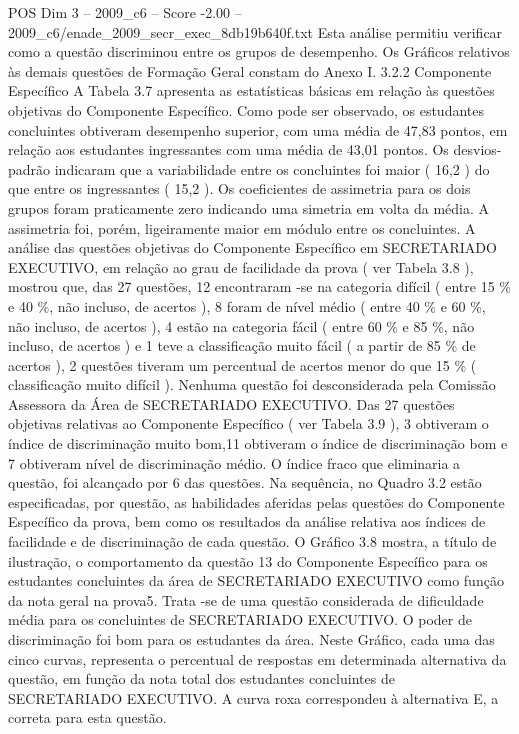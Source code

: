 \begin{textsample}{POS Dim 3 – 2009\_c6 – Score -2.00 – 2009\_c6/enade\_2009\_secr\_exec\_8db19b640f.txt}
Esta análise permitiu verificar como a questão discriminou entre os grupos de desempenho.
Os Gráficos relativos às demais questões de Formação Geral constam do Anexo I. 3.2.2 Componente Específico A Tabela 3.7 apresenta as estatísticas básicas em relação às questões objetivas do Componente Específico.
Como pode ser observado, os estudantes concluintes obtiveram desempenho superior, com uma média de 47,83 pontos, em relação aos estudantes ingressantes com uma média de 43,01 pontos.
Os desvios-padrão indicaram que a variabilidade entre os concluintes foi maior ( 16,2 ) do que entre os ingressantes ( 15,2 ).
Os coeficientes de assimetria para os dois grupos foram praticamente zero indicando uma simetria em volta da média.
A assimetria foi, porém, ligeiramente maior em módulo entre os concluintes.
A análise das questões objetivas do Componente Específico em SECRETARIADO EXECUTIVO, em relação ao grau de facilidade da prova ( ver Tabela 3.8 ), mostrou que, das 27 questões, 12 encontraram -se na categoria difícil ( entre 15 \% e 40 \%, não incluso, de acertos ), 8 foram de nível médio ( entre 40 \% e 60 \%, não incluso, de acertos ), 4 estão na categoria fácil ( entre 60 \% e 85 \%, não incluso, de acertos ) e 1 teve a classificação muito fácil ( a partir de 85 \% de acertos ), 2 questões tiveram um percentual de acertos menor do que 15 \% ( classificação muito difícil ).
Nenhuma questão foi desconsiderada pela Comissão Assessora da Área de SECRETARIADO EXECUTIVO.
Das 27 questões objetivas relativas ao Componente Específico ( ver Tabela 3.9 ), 3 obtiveram o índice de discriminação muito bom,11 obtiveram o índice de discriminação bom e 7 obtiveram nível de discriminação médio.
O índice fraco que eliminaria a questão, foi alcançado por 6 das questões.
Na sequência, no Quadro 3.2 estão especificadas, por questão, as habilidades aferidas pelas questões do Componente Específico da prova, bem como os resultados da análise relativa aos índices de facilidade e de discriminação de cada questão.
O Gráfico 3.8 mostra, a título de ilustração, o comportamento da questão 13 do Componente Específico para os estudantes concluintes da área de SECRETARIADO EXECUTIVO como função da nota geral na prova5.
Trata -se de uma questão considerada de dificuldade média para os concluintes de SECRETARIADO EXECUTIVO.
O poder de discriminação foi bom para os estudantes da área.
Neste Gráfico, cada uma das cinco curvas, representa o percentual de respostas em determinada alternativa da questão, em função da nota total dos estudantes concluintes de SECRETARIADO EXECUTIVO.
A curva roxa correspondeu à alternativa E, a correta para esta questão.

\end{textsample}
